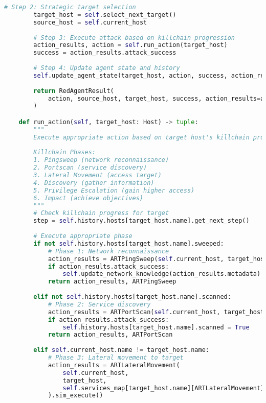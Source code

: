 \documentclass[12pt,a4paper]{article}
\begin{document}
\begin{lstlisting}[language=Python, caption=ART Agent Core Implementation]
        # Step 2: Strategic target selection
        target_host = self.select_next_target()
        source_host = self.current_host
        
        # Step 3: Execute attack based on killchain progression
        action_results, action = self.run_action(target_host)
        success = action_results.attack_success
        
        # Step 4: Update agent state and history
        self.update_agent_state(target_host, action, success, action_results)
        
        return RedAgentResult(
            action, source_host, target_host, success, action_results=action_results
        )

    def run_action(self, target_host: Host) -> tuple:
        """
        Execute appropriate action based on target host's killchain progress
        
        Killchain Phases:
        1. Pingsweep (network reconnaissance)
        2. Portscan (service discovery)  
        3. Lateral Movement (access target)
        4. Discovery (gather information)
        5. Privilege Escalation (gain higher access)
        6. Impact (achieve objectives)
        """
        # Check killchain progress for target
        step = self.history.hosts[target_host.name].get_next_step()
        
        # Execute appropriate phase
        if not self.history.hosts[target_host.name].sweeped:
            # Phase 1: Network reconnaissance
            action_results = ARTPingSweep(self.current_host, target_host).sim_execute()
            if action_results.attack_success:
                self.update_network_knowledge(action_results.metadata)
            return action_results, ARTPingSweep
            
        elif not self.history.hosts[target_host.name].scanned:
            # Phase 2: Service discovery
            action_results = ARTPortScan(self.current_host, target_host).sim_execute()
            if action_results.attack_success:
                self.history.hosts[target_host.name].scanned = True
            return action_results, ARTPortScan
            
        elif self.current_host.name != target_host.name:
            # Phase 3: Lateral movement to target
            action_results = ARTLateralMovement(
                self.current_host,
                target_host,
                self.services_map[target_host.name][ARTLateralMovement]
            ).sim_execute()
            

\end{lstlisting}
\end{document}
